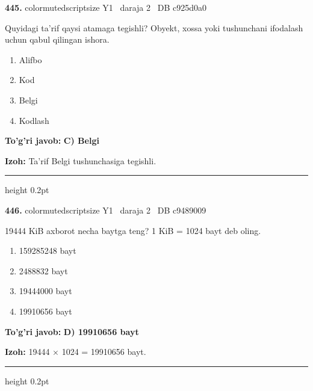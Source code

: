 \documentclass[10pt,a4paper,oneside]{article}
\begin{document}
\noindent\textbf{\color{ink}445.}  {color{muted}scriptsize Y1 \textbullet\ daraja 2 \textbullet\ DB c925d0a0}
\par
Quyidagi ta'rif qaysi atamaga tegishli? Obyekt, xossa yoki tushunchani ifodalash uchun qabul qilingan ishora.
\begin{enumerate}[label=\Alph*),leftmargin=9mm]
\item Alifbo
\item Kod
\item Belgi
\item Kodlash
\end{enumerate}
\begin{tcolorbox}[enhanced,breakable,colback=teal!4,colframe=teal!50!black,boxrule=0.5pt,arc=1.1mm,left=3mm,right=3mm,top=1.7mm,bottom=1.7mm,before skip=2mm,after skip=2mm]
\textbf{\color{teal}To'g'ri javob:} \textbf{C) Belgi}
\par\smallskip
\textbf{Izoh:} Ta'rif Belgi tushunchasiga tegishli.
\end{tcolorbox}
\vspace{2mm}\hrule height 0.2pt \vspace{3mm}

\noindent\textbf{\color{ink}446.}  {color{muted}scriptsize Y1 \textbullet\ daraja 2 \textbullet\ DB c9489009}
\par
19444 KiB axborot necha baytga teng? 1 KiB = 1024 bayt deb oling.
\begin{enumerate}[label=\Alph*),leftmargin=9mm]
\item 159285248 bayt
\item 2488832 bayt
\item 19444000 bayt
\item 19910656 bayt
\end{enumerate}
\begin{tcolorbox}[enhanced,breakable,colback=teal!4,colframe=teal!50!black,boxrule=0.5pt,arc=1.1mm,left=3mm,right=3mm,top=1.7mm,bottom=1.7mm,before skip=2mm,after skip=2mm]
\textbf{\color{teal}To'g'ri javob:} \textbf{D) 19910656 bayt}
\par\smallskip
\textbf{Izoh:} 19444 \ensuremath{\times} 1024 = 19910656 bayt.
\end{tcolorbox}
\vspace{2mm}\hrule height 0.2pt \vspace{3mm}
\end{document}
